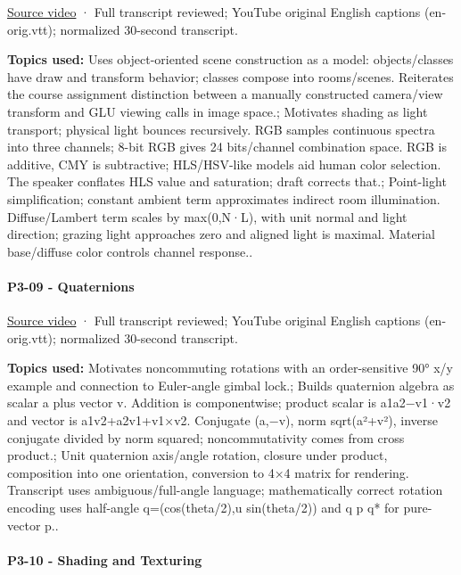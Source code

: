 \href{https://www.youtube.com/watch?v=TEjDYtkLRdQ}{Source video} · Full transcript reviewed; YouTube original English captions (en-orig.vtt); normalized 30-second transcript.

\textbf{Topics used:} Uses object-oriented scene construction as a model: objects/classes have draw and transform behavior; classes compose into rooms/scenes. Reiterates the course assignment distinction between a manually constructed camera/view transform and GLU viewing calls in image space.; Motivates shading as light transport; physical light bounces recursively. RGB samples continuous spectra into three channels; 8-bit RGB gives 24 bits/channel combination space. RGB is additive, CMY is subtractive; HLS/HSV-like models aid human color selection. The speaker conflates HLS value and saturation; draft corrects that.; Point-light simplification; constant ambient term approximates indirect room illumination. Diffuse/Lambert term scales by max(0,N·L), with unit normal and light direction; grazing light approaches zero and aligned light is maximal. Material base/diffuse color controls channel response..

\paragraph{P3-09 - Quaternions}\label{p3-09---quaternions}

\href{https://www.youtube.com/watch?v=mHVwd8gYLnI}{Source video} · Full transcript reviewed; YouTube original English captions (en-orig.vtt); normalized 30-second transcript.

\textbf{Topics used:} Motivates noncommuting rotations with an order-sensitive 90° x/y example and connection to Euler-angle gimbal lock.; Builds quaternion algebra as scalar a plus vector v. Addition is componentwise; product scalar is a1a2−v1·v2 and vector is a1v2+a2v1+v1×v2. Conjugate (a,−v), norm sqrt(a²+\textbar v\textbar²), inverse conjugate divided by norm squared; noncommutativity comes from cross product.; Unit quaternion axis/angle rotation, closure under product, composition into one orientation, conversion to 4×4 matrix for rendering. Transcript uses ambiguous/full-angle language; mathematically correct rotation encoding uses half-angle q=(cos(theta/2),u sin(theta/2)) and q p q* for pure-vector p..

\paragraph{P3-10 - Shading and Texturing}\label{p3-10---shading-and-texturing}

